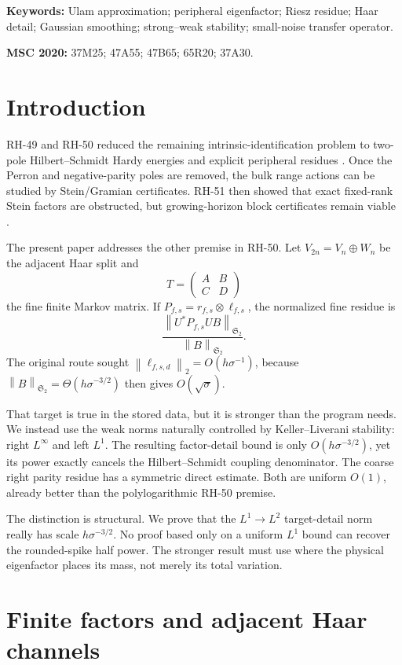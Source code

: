 \documentclass[11pt]{article}
\theoremstyle{remark}
\newcommand{\HS}{\mathfrak S_2}
\newcommand{\norm}[1]{\left\lVert #1\right\rVert}
\begin{document}
\noindent\textbf{Keywords:} Ulam approximation; peripheral eigenfactor;
Riesz residue; Haar detail; Gaussian smoothing; strong--weak stability;
small-noise transfer operator.

\medskip
\noindent\textbf{MSC 2020:} 37M25; 47A55; 47B65; 65R20; 37A30.

\section{Introduction}

RH-49 and RH-50 reduced the remaining intrinsic-identification problem to
two-pole Hilbert--Schmidt Hardy energies and explicit peripheral residues
\citep{WangDirectional2026,WangHardy2026}.  Once the Perron and
negative-parity poles are removed, the bulk range actions can be studied by
Stein/Gramian certificates.  RH-51 then showed that exact fixed-rank Stein
factors are obstructed, but growing-horizon block certificates remain
viable \citep{WangStructuredStein2026}.

The present paper addresses the other premise in RH-50.  Let
\(V_{2n}=V_n\oplus W_n\) be the adjacent Haar split and
\[
 T=\begin{pmatrix}A&B\\C&D\end{pmatrix}
\]
the fine finite Markov matrix.  If
\(P_{f,s}=r_{f,s}\otimes\ell_{f,s}\), the normalized fine residue is
\[
 \frac{\norm{U^*P_{f,s}UB}_{\HS}}{\norm B_{\HS}}.
\]
The original route sought
\(\norm{\ell_{f,s,d}}_2=O(h\sigma^{-1})\), because
\(\norm B_{\HS}=\Theta(h\sigma^{-3/2})\) then gives
\(O(\sqrt{\sigma})\).

That target is true in the stored data, but it is stronger than the
program needs.  We instead use the weak norms naturally controlled by
Keller--Liverani stability: right \(L^\infty\) and left \(L^1\).
The resulting factor-detail bound is only \(O(h\sigma^{-3/2})\), yet its
power exactly cancels the Hilbert--Schmidt coupling denominator.  The
coarse right parity residue has a symmetric direct estimate.  Both are
uniform \(O(1)\), already better than the polylogarithmic RH-50 premise.

The distinction is structural.  We prove that the \(L^1\to L^2\)
target-detail norm really has scale \(h\sigma^{-3/2}\).  No proof based
only on a uniform \(L^1\) bound can recover the rounded-spike half power.
The stronger result must use where the physical eigenfactor places its
mass, not merely its total variation.

\section{Finite factors and adjacent Haar channels}
\end{document}
